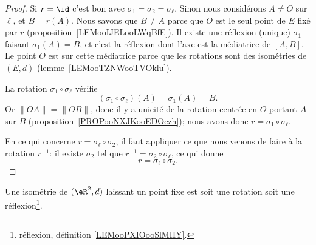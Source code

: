\begin{proof}
	Si \( r=\id\) c'est bon avec \( \sigma_1=\sigma_2=\sigma_{\ell}\). Sinon nous considérons \( A\neq O\) sur \( \ell\), et \( B=r(A)\). Nous savons que \( B\neq A\) parce que \( O\) est le seul point de \( E\) fixé par \( r\) (proposition~\ref{LEMooIJELooLWqBfE}). Il existe une réflexion (unique) \( \sigma_1\) faisant \( \sigma_1(A)=B\), et c'est la réflexion dont l'axe est la médiatrice de \( [A,B]\). Le point \( O\) est sur cette médiatrice parce que les rotations sont des isométries de \( (E,d)\) (lemme~\ref{LEMooTZNWooTVOklu}).

	La rotation \( \sigma_1\circ \sigma_{\ell}\) vérifie
	\begin{equation}
		(\sigma_1\circ\sigma_{\ell})(A)=\sigma_1(A)=B.
	\end{equation}
	Or \( \| OA \|=\| OB \|\), donc il y a unicité de la rotation centrée en \( O\) portant \( A\) sur \( B\) (proposition~\ref{PROPooNXJKooEDOczh}); nous avons donc \( r=\sigma_1\circ\sigma_{\ell}\).

	En ce qui concerne \( r=\sigma_{\ell}\circ\sigma_2\), il faut appliquer ce que nous venons de faire à la rotation \( r^{-1}\): il existe \( \sigma_2\) tel que \( r^{-1}=\sigma_2\circ\sigma_{\ell}\), ce qui donne
	\begin{equation}
		r=\sigma_{\ell}\circ\sigma_2.
	\end{equation}
\end{proof}


\begin{lemma}	\label{LEMooDIHOooRMfzHB}
	Une isométrie de \( (\eR^2,d)\) laissant un point fixe est soit une rotation soit une réflexion\footnote{réflexion, définition \ref{LEMooPXIOooSlMIIY}.}.
\end{lemma}

